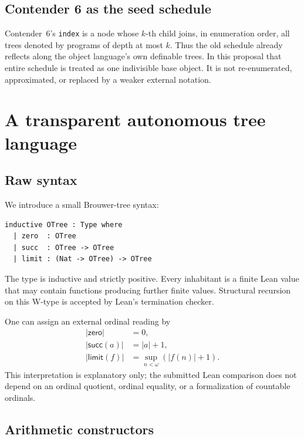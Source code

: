\documentclass[11pt]{article}
\theoremstyle{definition}
\theoremstyle{remark}
\newcommand{\lean}[1]{\texttt{#1}}
\begin{document}
\subsection{Contender 6 as the seed schedule}

Contender~6's \lean{index} is a node whose $k$-th child joins, in enumeration
order, all trees denoted by programs of depth at most $k$.  Thus the old
schedule already reflects along the object language's own definable trees.  In
this proposal that entire schedule is treated as one indivisible base object.
It is not re-enumerated, approximated, or replaced by a weaker external
notation.

\section{A transparent autonomous tree language}

\subsection{Raw syntax}

We introduce a small Brouwer-tree syntax:
\begin{lstlisting}
inductive OTree : Type where
  | zero  : OTree
  | succ  : OTree -> OTree
  | limit : (Nat -> OTree) -> OTree
\end{lstlisting}
The type is inductive and strictly positive.  Every inhabitant is a finite Lean
value that may contain functions producing further finite values.  Structural
recursion on this W-type is accepted by Lean's termination checker.

One can assign an external ordinal reading by
\[
\begin{aligned}
  |\mathsf{zero}| &= 0,\\
  |\mathsf{succ}(a)| &= |a|+1,\\
  |\mathsf{limit}(f)| &= \sup_{n<\omega}(|f(n)|+1).
\end{aligned}
\]
This interpretation is explanatory only; the submitted Lean comparison does
not depend on an ordinal quotient, ordinal equality, or a formalization of
countable ordinals.

\subsection{Arithmetic constructors}
\end{document}
